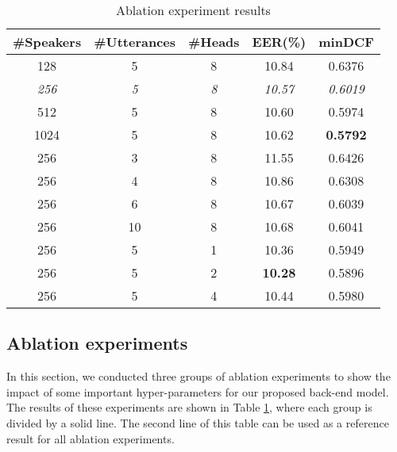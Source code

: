 \documentclass[a4paper]{article}
\begin{document}
\setlength{\tabcolsep}{1.2mm}
\begin{table}[t]
\footnotesize
  \caption{Ablation experiment results}
  \label{tab:ablation}
  \centering
  \vspace{-2mm}
  \begin{tabular}{c c c c c}
    \toprule
    \multicolumn{1}{c}{\textbf{\#Speakers}} & \multicolumn{1}{c}{\textbf{\#Utterances}} & \multicolumn{1}{c}{\textbf{\#Heads}} & \multicolumn{1}{c}{\textbf{EER(\%)}} & \multicolumn{1}{c}{\textbf{minDCF}}\\
    \midrule
    128          & 5          & 8          & 10.84          & 0.6376            \\
    \textit{256} & \textit{5} & \textit{8} & \textit{10.57} & \textit{0.6019}   \\
    512          & 5          & 8          & 10.60          & 0.5974            \\
    1024         & 5          & 8          & 10.62          & \textbf{0.5792}   \\
    \midrule
    256          & 3          & 8          & 11.55          & 0.6426            \\
    256          & 4          & 8          & 10.86          & 0.6308            \\
    256          & 6          & 8          & 10.67          & 0.6039            \\
    256          & 10         & 8          & 10.68          & 0.6041            \\
    \midrule
    256          & 5          & 1          & 10.36          & 0.5949            \\
    256          & 5          & 2          & \textbf{10.28} & 0.5896            \\
    256          & 5          & 4          & 10.44          & 0.5980            \\
    \bottomrule
  \end{tabular}
   \vspace{-5mm}
\end{table}

\vspace{-1.5mm}
\subsection{Ablation experiments}


In this section, we conducted three groups of ablation experiments to show the impact of some important hyper-parameters for our proposed back-end model. The results of these experiments are shown in Table \ref{tab:ablation}, where each group is divided by a solid line. The second line of this table can be used as a reference result for all ablation experiments. 
\end{document}
